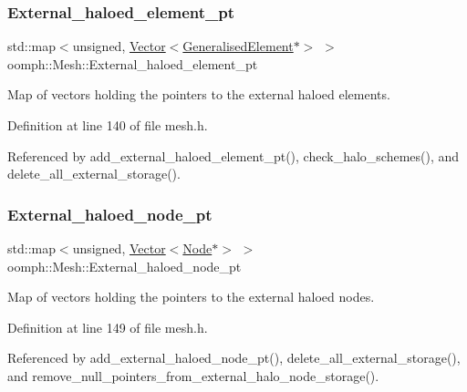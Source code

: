 \subsubsection{\texorpdfstring{External\+\_\+haloed\+\_\+element\+\_\+pt}{External\_haloed\_element\_pt}}
{\footnotesize\ttfamily std\+::map$<$unsigned, \hyperlink{classoomph_1_1Vector}{Vector}$<$\hyperlink{classoomph_1_1GeneralisedElement}{Generalised\+Element}$\ast$$>$ $>$ oomph\+::\+Mesh\+::\+External\+\_\+haloed\+\_\+element\+\_\+pt\hspace{0.3cm}{\ttfamily [protected]}}



Map of vectors holding the pointers to the external haloed elements. 



Definition at line 140 of file mesh.\+h.



Referenced by add\+\_\+external\+\_\+haloed\+\_\+element\+\_\+pt(), check\+\_\+halo\+\_\+schemes(), and delete\+\_\+all\+\_\+external\+\_\+storage().

\mbox{\label{classoomph_1_1Mesh_a6af0686ce8758874520426cfac5e7899}} 
\subsubsection{\texorpdfstring{External\+\_\+haloed\+\_\+node\+\_\+pt}{External\_haloed\_node\_pt}}
{\footnotesize\ttfamily std\+::map$<$unsigned, \hyperlink{classoomph_1_1Vector}{Vector}$<$\hyperlink{classoomph_1_1Node}{Node}$\ast$$>$ $>$ oomph\+::\+Mesh\+::\+External\+\_\+haloed\+\_\+node\+\_\+pt\hspace{0.3cm}{\ttfamily [protected]}}



Map of vectors holding the pointers to the external haloed nodes. 



Definition at line 149 of file mesh.\+h.



Referenced by add\+\_\+external\+\_\+haloed\+\_\+node\+\_\+pt(), delete\+\_\+all\+\_\+external\+\_\+storage(), and remove\+\_\+null\+\_\+pointers\+\_\+from\+\_\+external\+\_\+halo\+\_\+node\+\_\+storage().

